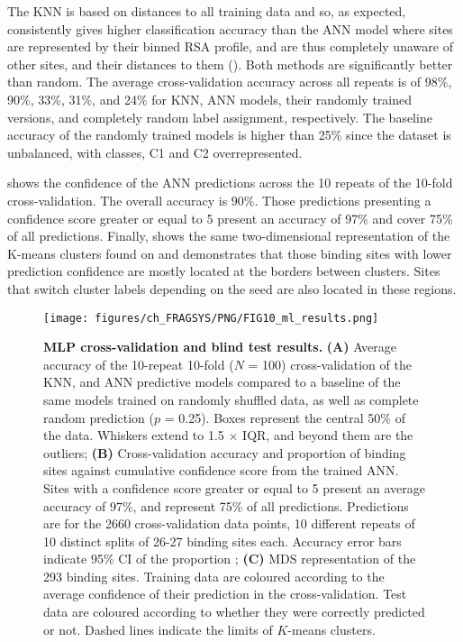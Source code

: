 \vspace{-20pt} %

The KNN is based on distances to all training data and so, as expected, consistently gives higher classification accuracy than the ANN model where sites are represented by their binned RSA profile, and are thus completely unaware of other sites, and their distances to them (). Both methods are significantly better than random. The average cross-validation accuracy across all repeats is of 98\%, 90\%, 33\%, 31\%, and 24\% for KNN, ANN models, their randomly trained versions, and completely random label assignment, respectively. The baseline accuracy of the randomly trained models is higher than 25\% since the dataset is unbalanced, with classes, C1 and C2 overrepresented.

 shows the confidence of the ANN predictions across the 10 repeats of the 10-fold cross-validation. The overall accuracy is 90\%. Those predictions presenting a confidence score greater or equal to 5 present an accuracy of 97\% and cover 75\% of all predictions. Finally,  shows the same two-dimensional representation of the K-means clusters found on  and demonstrates that those binding sites with lower prediction confidence are mostly located at the borders between clusters. Sites that switch cluster labels depending on the seed are also located in these regions.

\begin{figure}[htb!]
    \centering
    \texttt{[image: figures/ch\_FRAGSYS/PNG/FIG10\_ml\_results.png]}
    \caption[MLP cross-validation and blind test results]{\textbf{MLP cross-validation and blind test results.} \textbf{(A)} Average accuracy of the 10-repeat 10-fold ($N$ = 100) cross-validation of the KNN, and ANN predictive models compared to a baseline of the same models trained on randomly shuffled data, as well as complete random prediction ($p$ = 0.25). Boxes represent the central 50\% of the data. Whiskers extend to 1.5 $\times$ IQR, and beyond them are the outliers; \textbf{(B)} Cross-validation accuracy and proportion of binding sites against cumulative confidence score from the trained ANN. Sites with a confidence score greater or equal to 5 present an average accuracy of 97\%, and represent 75\% of all predictions. Predictions are for the 2660 cross-validation data points, 10 different repeats of 10 distinct splits of 26-27 binding sites each. Accuracy error bars indicate 95\% CI of the proportion \cite{WILSON_197_PROP_CI}; \textbf{(C)} MDS representation of the 293 binding sites. Training data are coloured according to the average confidence of their prediction in the cross-validation. Test data are coloured according to whether they were correctly predicted or not. Dashed lines indicate the limits of $K$-means clusters.}
    \label{fig:MLP_CV_blind_test}
\end{figure}

